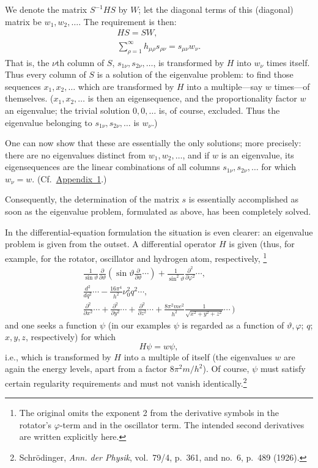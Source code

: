 \documentclass[fontsize=13pt,paper=b5,twoside,bookmarkpackage=false]{scrartcl}
\newcommand{\App}[1]{\hyperref[app:#1]{Appendix~#1}}
\newcounter{translatornote}
\newcommand{\tnote}[1]{%
  \begingroup\stepcounter{translatornote}%
  \renewcommand{\thefootnote}{T\arabic{translatornote}}%
  \footnote[0]{#1}\endgroup}
\begin{document}
We denote the matrix $S^{-1}HS$ by $W$; let the diagonal terms of this (diagonal) matrix be $w_1,w_2,\ldots$. The requirement is then:
\begin{gather*}
HS=SW,\\
\sum_{\rho=1}^{\infty}h_{\mu\rho}s_{\rho\nu}=s_{\mu\nu}w_\nu.
\end{gather*}
That is, the $\nu$th column of $S$, $s_{1\nu},s_{2\nu},\ldots$, is transformed by $H$ into $w_\nu$ times itself. Thus every column of $S$ is a solution of the eigenvalue problem: to find those sequences $x_1,x_2,\ldots$ which are transformed by $H$ into a multiple---say $w$ times---of themselves. ($x_1,x_2,\ldots$ is then an eigensequence, and the proportionality factor $w$ an eigenvalue; the trivial solution $0,0,\ldots$ is, of course, excluded. Thus the eigenvalue belonging to $s_{1\nu},s_{2\nu},\ldots$ is $w_\nu$.)

One can now show that these are essentially the only solutions; more precisely: there are no eigenvalues distinct from $w_1,w_2,\ldots$, and if $w$ is an eigenvalue, its eigensequences are the linear combinations of all columns $s_{1\nu},s_{2\nu},\ldots$ for which $w_\nu=w$. (Cf.\ \App{1}.)

Consequently, the determination of the matrix $s$ is essentially accomplished as soon as the eigenvalue problem, formulated as above, has been completely solved.

In the differential-equation formulation the situation is even clearer: an eigenvalue problem is given from the outset. A differential operator $H$ is given (thus, for example, for the rotator, oscillator and hydrogen atom, respectively,\tnote{The original omits the exponent 2 from the derivative symbols in the rotator's $\varphi$-term and in the oscillator term. The intended second derivatives are written explicitly here.}
\begin{gather*}
\frac{1}{\sin\vartheta}\frac{\partial}{\partial\vartheta}
\left(\sin\vartheta\frac{\partial}{\partial\vartheta}\cdots\right)
+\frac{1}{\sin^2\vartheta}\frac{\partial^2}{\partial\varphi^2}\cdots,\\
\frac{d^2}{dq^2}\cdots-\frac{16\pi^4}{h^2}\nu_0^2q^2\cdots,\\
\frac{\partial^2}{\partial x^2}\cdots+
\frac{\partial^2}{\partial y^2}\cdots+
\frac{\partial^2}{\partial z^2}\cdots+
\frac{8\pi^2me^2}{h^2}\frac{1}{\sqrt{x^2+y^2+z^2}}\cdots\,\biggr)
\end{gather*}
and one seeks a function $\psi$ (in our examples $\psi$ is regarded as a function of $\vartheta,\varphi$; $q$; $x,y,z$, respectively) for which
\[
H\psi=w\psi,
\]
i.e., which is transformed by $H$ into a multiple of itself (the eigenvalues $w$ are again the energy levels, apart from a factor $8\pi^2m/h^2$). Of course, $\psi$ must satisfy certain regularity requirements and must not vanish identically.\footnote[10]{\label{fn:10}Schrödinger, \emph{Ann. der Physik}, vol.~79/4, p.~361, and no.~6, p.~489 (1926).}
\end{document}
